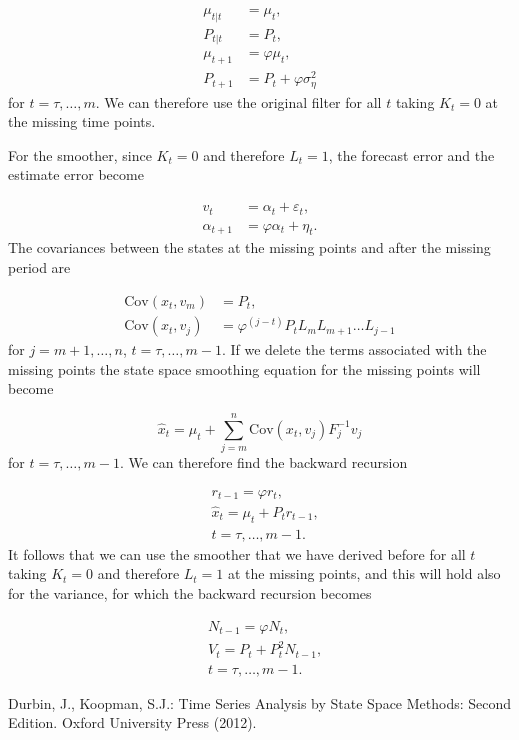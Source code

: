 \documentclass[11pt,a4paper]{article}
\newcommand{\cov}{\mathrm{Cov}}
\begin{document}
\begin{align*}
    \mu_{t|t} &= \mu_t,\\
    P_{t|t} &= P_t,\\
    \mu_{t+1} &= \varphi \mu_t,\\
    P_{t+1} &= P_t + \varphi \sigma^2_\eta
\end{align*}
for $t = \tau, \dots, m$. We can therefore use the original filter for all $t$ taking $K_t = 0$ at the missing time points.

For the smoother, since $K_t = 0$ and therefore $L_t = 1$, the forecast error and the estimate error become

\begin{align*}
    v_t &= \alpha_t + \varepsilon_t,\\
    \alpha_{t+1} &= \varphi \alpha_t + \eta_t.
\end{align*}
The covariances between the states at the missing points and after the missing period are

\begin{align*}
    \cov(x_t, v_m) &= P_t,\\
    \cov(x_t, v_j) &= \varphi^{(j-t)} P_t L_m L_{m+1} \dots L_{j-1}
\end{align*}
for $j = m+1, \dots, n$, $t = \tau, \dots, m - 1$.
If we delete the terms associated with the missing points the state space smoothing equation for the missing points will become

\[
    \hat{x}_t = \mu_t + \sum^n_{j=m}\cov (x_t, v_j)F_j^{-1}v_j
\]
for $t = \tau, \dots, m-1$. We can therefore find the backward recursion

\begin{align*}
    &r_{t-1} = \varphi r_t,\\
    &\hat{x}_t = \mu_t + P_t r_{t-1},\\
    &t = \tau, \dots, m-1.
\end{align*}
It follows that we can use the smoother that we have derived before for all $t$ taking $K_t = 0$ and therefore $L_t = 1$ at the missing points, and this will hold also for the variance, for which the backward recursion becomes

\begin{align*}
    &N_{t-1} = \varphi N_t,\\
    &V_t = P_t + P^2_t N_{t-1},\\
    &t = \tau, \dots, m-1.
\end{align*}








\begin{thebibliography}{}

Durbin, J., Koopman, S.J.: Time Series Analysis by State Space Methods: Second Edition. Oxford University Press (2012). 

\end{thebibliography}
\end{document}
